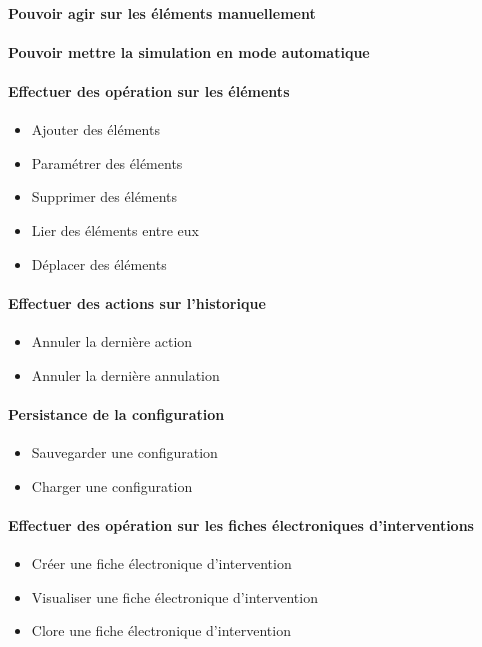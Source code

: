 {
	\paragraph{ Pouvoir agir sur les éléments manuellement}
	\paragraph{ Pouvoir mettre la simulation en mode automatique}
}
{
\paragraph{Effectuer des opération sur les éléments }
\begin{itemize}
	\item Ajouter des éléments
	\item Paramétrer des éléments
	\item Supprimer des éléments
	\item Lier des éléments entre eux
	\item Déplacer des éléments
\end{itemize}

\paragraph{Effectuer des actions sur l'historique}
\begin{itemize}
	\item Annuler la dernière action
	\item Annuler la dernière annulation
\end{itemize}

\paragraph{Persistance de la configuration}
\begin{itemize}
	\item Sauvegarder une configuration
	\item Charger une configuration
\end{itemize}

\paragraph{Effectuer des opération sur les fiches électroniques d'interventions}
\begin{itemize}
	\item Créer une fiche électronique d'intervention
	\item Visualiser une fiche électronique d'intervention
	\item Clore une fiche électronique d'intervention
\end{itemize}

}
